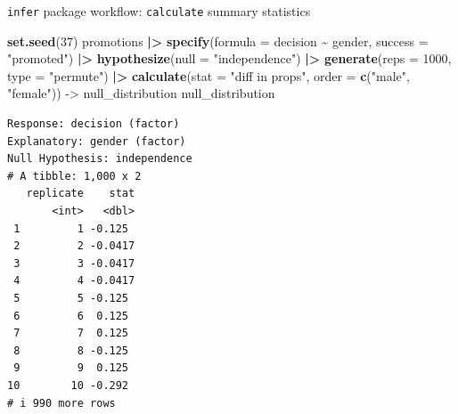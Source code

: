 \documentclass[
  ignorenonframetext,
]{beamer}
\newenvironment{Shaded}{\begin{snugshade}}{\end{snugshade}}
\newcommand{\AttributeTok}[1]{\textcolor[rgb]{0.13,0.29,0.53}{#1}}
\newcommand{\DecValTok}[1]{\textcolor[rgb]{0.00,0.00,0.81}{#1}}
\newcommand{\FunctionTok}[1]{\textcolor[rgb]{0.13,0.29,0.53}{\textbf{#1}}}
\newcommand{\NormalTok}[1]{#1}
\newcommand{\OtherTok}[1]{\textcolor[rgb]{0.56,0.35,0.01}{#1}}
\newcommand{\SpecialCharTok}[1]{\textcolor[rgb]{0.81,0.36,0.00}{\textbf{#1}}}
\newcommand{\StringTok}[1]{\textcolor[rgb]{0.31,0.60,0.02}{#1}}
\begin{document}
\begin{frame}[fragile]{\texttt{infer} package workflow:
\texttt{calculate} summary statistics}
\protect\hypertarget{infer-package-workflow-calculate-summary-statistics-1}{}
\tiny

\begin{Shaded}
\begin{Highlighting}[]
\FunctionTok{set.seed}\NormalTok{(}\DecValTok{37}\NormalTok{)}
\NormalTok{promotions }\SpecialCharTok{|\textgreater{}} 
  \FunctionTok{specify}\NormalTok{(}\AttributeTok{formula =}\NormalTok{ decision }\SpecialCharTok{\textasciitilde{}}\NormalTok{ gender, }\AttributeTok{success =} \StringTok{"promoted"}\NormalTok{) }\SpecialCharTok{|\textgreater{}} 
  \FunctionTok{hypothesize}\NormalTok{(}\AttributeTok{null =} \StringTok{"independence"}\NormalTok{) }\SpecialCharTok{|\textgreater{}} 
  \FunctionTok{generate}\NormalTok{(}\AttributeTok{reps =} \DecValTok{1000}\NormalTok{, }\AttributeTok{type =} \StringTok{"permute"}\NormalTok{) }\SpecialCharTok{|\textgreater{}} 
  \FunctionTok{calculate}\NormalTok{(}\AttributeTok{stat =} \StringTok{"diff in props"}\NormalTok{, }\AttributeTok{order =} \FunctionTok{c}\NormalTok{(}\StringTok{"male"}\NormalTok{, }\StringTok{"female"}\NormalTok{)) }\OtherTok{{-}\textgreater{}}\NormalTok{ null\_distribution}
\NormalTok{null\_distribution}
\end{Highlighting}
\end{Shaded}

\begin{verbatim}
Response: decision (factor)
Explanatory: gender (factor)
Null Hypothesis: independence
# A tibble: 1,000 x 2
   replicate    stat
       <int>   <dbl>
 1         1 -0.125 
 2         2 -0.0417
 3         3 -0.0417
 4         4 -0.0417
 5         5 -0.125 
 6         6  0.125 
 7         7  0.125 
 8         8 -0.125 
 9         9  0.125 
10        10 -0.292 
# i 990 more rows
\end{verbatim}

\normalsize
\end{frame}
\end{document}
